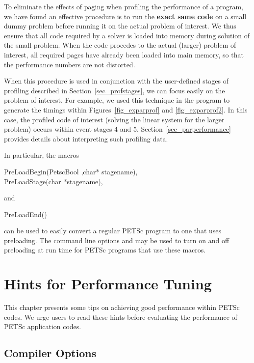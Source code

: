 {{To eliminate the effects of paging when profiling the performance of a
program, we have found an effective procedure is to run the {\bf exact same
code} on a small dummy problem before running it on the actual problem
of interest. We thus ensure that all code required by a solver is
loaded into memory during solution of the small problem.  When the
code procedes to the actual (larger) problem of interest, all required
pages have already been loaded into main memory, so that the
performance numbers are not distorted.

When this procedure is used in conjunction with the user-defined stages of profiling
described in Section~\ref{sec_profstages}, we can focus easily on the
problem of interest.  For example, we used this technique in the program
 to
generate the timings within Figures~\ref{fig_exparprof} and \ref{fig_exparprof2}.
In this case,
the profiled code of interest (solving the linear system for the larger problem)
occurs within event stages 4 and 5.  Section~\ref{sec_parperformance} provides
details about interpreting such profiling data.

In particular, the macros 
\begin{tabbing}
  PreLoadBegin(PetscBool ,char* stagename),\\
  PreLoadStage(char *stagename),
\end{tabbing}
and 
\begin{tabbing}
  PreLoadEnd()
\end{tabbing}
can be used to easily 
convert a regular PETSc program to one that uses preloading. The command line options
  and   may be used to turn on and off
preloading at run time for PETSc programs that use these macros. 

\cleardoublepage
\chapter{Hints for Performance Tuning} 
\label{ch_performance} \hypertarget{ch_performance}{}

This chapter presents some tips on achieving good performance within
PETSc codes.  We urge users to read these hints before
evaluating the performance of PETSc application codes.

\section{Compiler Options}


}}
